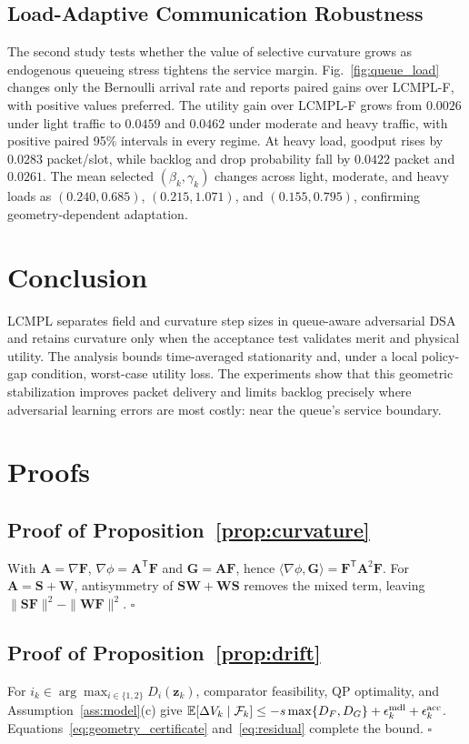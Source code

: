\documentclass[conference]{IEEEtran}
\newcommand{\bF}{\bm{F}}
\newcommand{\bG}{\bm{G}}
\newcommand{\bz}{\bm{z}}
\newcommand{\bA}{\bm{A}}
\newcommand{\bS}{\bm{S}}
\newcommand{\bW}{\bm{W}}
\newcommand{\E}{\mathbb{E}}
\begin{document}
\subsection{Load-Adaptive Communication Robustness}
The second study tests whether the value of selective curvature grows as endogenous queueing stress tightens the service margin.
Fig.~\ref{fig:queue_load} changes only the Bernoulli arrival rate and reports paired gains over LCMPL-F, with positive values preferred.
The utility gain over LCMPL-F grows from $0.0026$ under light traffic to $0.0459$ and $0.0462$ under moderate and heavy traffic, with positive paired 95\% intervals in every regime.
At heavy load, goodput rises by $0.0283$ packet/slot, while backlog and drop probability fall by $0.0422$ packet and $0.0261$.
The mean selected $(\beta_k,\gamma_k)$ changes across light, moderate, and heavy loads as $(0.240,0.685)$, $(0.215,1.071)$, and $(0.155,0.795)$, confirming geometry-dependent adaptation.

\section{Conclusion}
LCMPL separates field and curvature step sizes in queue-aware adversarial DSA and retains curvature only when the acceptance test validates merit and physical utility.
The analysis bounds time-averaged stationarity and, under a local policy-gap condition, worst-case utility loss.
The experiments show that this geometric stabilization improves packet delivery and limits backlog precisely where adversarial learning errors are most costly: near the queue's service boundary.

\appendices
\section{Proofs}
\label{app:supplement}
\subsection{Proof of Proposition~\ref{prop:curvature}}
\label{app:proof-curvature}
With $\bA=\nabla\bF$, $\nabla\phi=\bA^{\mathsf T}\bF$ and $\bG=\bA\bF$, hence $\langle\nabla\phi,\bG\rangle=\bF^{\mathsf T}\bA^2\bF$. For $\bA=\bS+\bW$, antisymmetry of $\bS\bW+\bW\bS$ removes the mixed term, leaving $\|\bS\bF\|^2-\|\bW\bF\|^2$.
\hfill$\square$

\subsection{Proof of Proposition~\ref{prop:drift}}
\label{app:proof-drift}
For $i_k\in\arg\max_{i\in\{1,2\}}D_i(\bz_k)$, comparator feasibility, QP optimality, and Assumption~\ref{ass:model}(c) give $\E[\Delta V_k\mid\mathcal F_k]\leq-s\max\{D_F,D_G\}+\epsilon_k^{\rm mdl}+\epsilon_k^{\rm acc}$. Equations~\eqref{eq:geometry_certificate} and~\eqref{eq:residual} complete the bound.
\hfill$\square$
\end{document}
